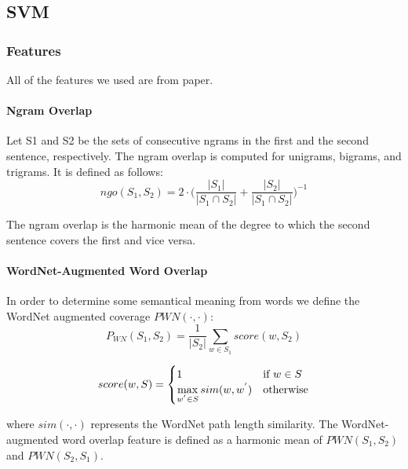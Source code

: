 \documentclass[10pt, a4paper]{article}
\begin{document}
\newpage
\subsection{SVM}

\subsubsection{Features}
All of the features we used are from \citep{Saric2012TakeLabSF} paper.
\paragraph{Ngram Overlap \\}
Let S1 and S2 be the sets of consecutive ngrams in the first and the second sentence, respectively. The ngram overlap is computed for unigrams, bigrams, and trigrams. It is defined as follows:
\begin{equation}\label{eq:ngo}
ngo(S_1, S_2) = 2 \cdot \bigg( \frac{|S_1|}{|S_1 \cap S_2|}+\frac{|S_2|}{|S_1 \cap S_2|}\bigg)^{-1}
\end{equation}

The ngram overlap is the harmonic mean of the degree
to which the second sentence covers the first
and vice versa.\citep{Saric2012TakeLabSF}

\paragraph{WordNet-Augmented Word Overlap \\}
In order to determine some semantical meaning from words we define the WordNet augmented coverage $ PWN(\cdot, \cdot) $:
\begin{equation}\label{eq:pwn}
P_{WN}(S_1, S_2) = \frac{1}{|S_2|} \sum_{w \in S_1} score(w, S_2)
\end{equation}

\begin{equation}\label{eq:pwn-score}
score(w, S) = \begin{cases}
1 & \text{if $w \in S $}\\
\max\limits_{w^{\rq} \in S} sim(w, w^{\rq}) & \text{otherwise}
\end{cases}
\end{equation}

where $sim(\cdot, \cdot)$ represents the WordNet path length
similarity. The WordNet-augmented word overlap
feature is defined as a harmonic mean of
$PWN(S_1, S_2)$ and $PWN(S_2, S_1)$.\citep{Saric2012TakeLabSF}
\end{document}
